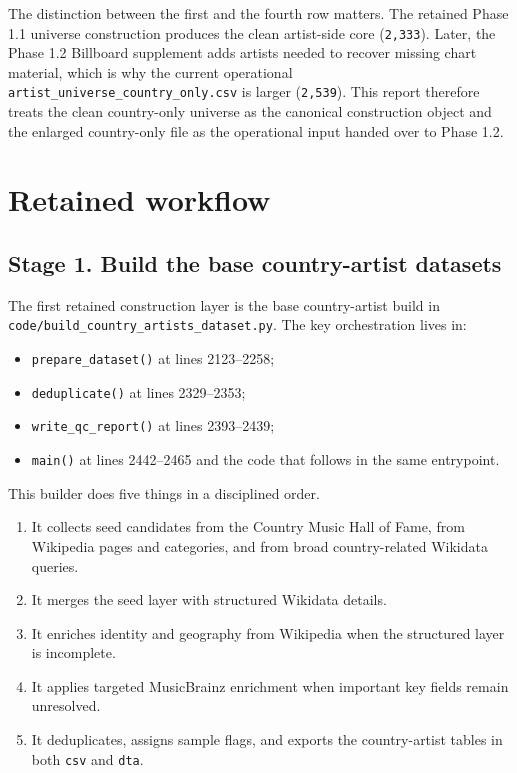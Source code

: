 \documentclass[11pt]{article}
\begin{document}
The distinction between the first and the fourth row matters. The retained
Phase 1.1 universe construction produces the clean artist-side core
(\texttt{2,333}). Later, the Phase 1.2 Billboard supplement adds artists needed
to recover missing chart material, which is why the current operational
\texttt{artist\_universe\_country\_only.csv} is larger (\texttt{2,539}). This
report therefore treats the clean country-only universe as the canonical
construction object and the enlarged country-only file as the operational input
handed over to Phase 1.2.

\section{Retained workflow}

\subsection{Stage 1. Build the base country-artist datasets}
The first retained construction layer is the base country-artist build in
\texttt{code/build\_country\_artists\_dataset.py}. The key orchestration lives in:
\begin{itemize}[leftmargin=2em]
\item \texttt{prepare\_dataset()} at lines 2123--2258;
\item \texttt{deduplicate()} at lines 2329--2353;
\item \texttt{write\_qc\_report()} at lines 2393--2439;
\item \texttt{main()} at lines 2442--2465 and the code that follows in the same
entrypoint.
\end{itemize}

This builder does five things in a disciplined order.
\begin{enumerate}[leftmargin=2em]
\item It collects seed candidates from the Country Music Hall of Fame, from
Wikipedia pages and categories, and from broad country-related Wikidata
queries.
\item It merges the seed layer with structured Wikidata details.
\item It enriches identity and geography from Wikipedia when the structured
layer is incomplete.
\item It applies targeted MusicBrainz enrichment when important key fields
remain unresolved.
\item It deduplicates, assigns sample flags, and exports the country-artist
tables in both \texttt{csv} and \texttt{dta}.
\end{enumerate}
\end{document}
